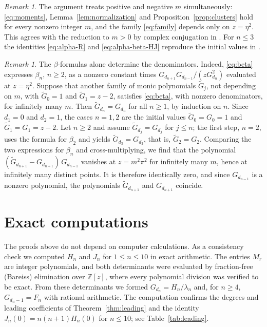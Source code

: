 \documentclass[11pt]{amsart}
\theoremstyle{remark}
\newtheorem{remark}[theorem]{Remark}
\numberwithin{equation}{section}
\newcommand{\Z}{\mathbb{Z}}
\begin{document}
\begin{remark}
The argument treats positive and negative $m$ simultaneously: \eqref{eq:moments}, Lemma~\ref{lem:normalization} and Proposition~\ref{prop:clusters} hold for every nonzero integer $m$, and the family \eqref{eq:family} depends only on $z=\eta^2$. This agrees with the reduction to $m>0$ by complex conjugation in \cite[Section~2]{MC}. For $n\le3$ the identities \eqref{eq:alpha-R} and \eqref{eq:alpha-beta-HJ} reproduce the initial values in \cite[Table~4]{LZ}.
\end{remark}

\begin{remark}
The $\beta$-formulas alone determine the denominators. Indeed, \eqref{eq:beta} expresses $\beta_n$, $n\ge2$, as a nonzero constant times $G_{d_{n+1}}G_{d_{n-1}}/(zG_{d_n}^2)$ evaluated at $z=\eta^2$. Suppose that another family of monic polynomials $\widetilde G_j$, not depending on $m$, with $\widetilde G_0=1$ and $\widetilde G_1=z-2$, satisfies \eqref{eq:beta}, with nonzero denominators, for infinitely many $m$. Then $\widetilde G_{d_n}=G_{d_n}$ for all $n\ge1$, by induction on $n$. Since $d_1=0$ and $d_2=1$, the cases $n=1,2$ are the initial values $\widetilde G_0=G_0=1$ and $\widetilde G_1=G_1=z-2$. Let $n\ge2$ and assume $\widetilde G_{d_j}=G_{d_j}$ for $j\le n$; the first step, $n=2$, uses the formula for $\beta_2$ and yields $\widetilde G_{d_3}=G_{d_3}$, that is, $\widetilde G_2=G_2$. Comparing the two expressions for $\beta_n$ and cross-multiplying, we find that the polynomial $(\widetilde G_{d_{n+1}}-G_{d_{n+1}})\,G_{d_{n-1}}$ vanishes at $z=m^2\pi^2$ for infinitely many $m$, hence at infinitely many distinct points. It is therefore identically zero, and since $G_{d_{n-1}}$ is a nonzero polynomial, the polynomials $\widetilde G_{d_{n+1}}$ and $G_{d_{n+1}}$ coincide.
\end{remark}

\section{Exact computations}\label{sec:computations}

The proofs above do not depend on computer calculations. As a consistency check we computed $H_n$ and $J_n$ for $1\le n\le10$ in exact arithmetic. The entries $M_r$ are integer polynomials, and both determinants were evaluated by fraction-free (Bareiss) elimination over $\Z[z]$, where every polynomial division was verified to be exact. From these determinants we formed $G_{d_n}=H_n/\lambda_n$ and, for $n\ge4$, $G_{d_n-1}=F_n$ with rational arithmetic. The computation confirms the degrees and leading coefficients of Theorem~\ref{thm:leading} and the identity $J_n(0)=n(n+1)H_n(0)$ for $n\le10$; see Table~\ref{tab:leading}.
\end{document}
